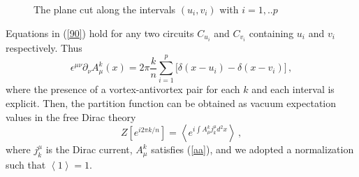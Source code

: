\documentclass[11pt]{article}
\begin{document}
\begin{figure} [tbp]
\centering
\leavevmode
\epsfxsize=10cm
\bigskip
{}
\caption{The plane cut along the intervals $(u_i,v_i)$ with $i=1,..p$}
\label{fihi}
\end{figure}



Equations in (\ref{90}) hold for any two circuits
$C_{u_{i}}$ and $C_{v_{i}}$  containing $u_{i}$ and $v_{i}$
respectively. Thus
\begin{equation}
\epsilon ^{\mu \nu }\partial _{\nu}A_{\mu }^{k}(x)=2\pi \frac{k}{n}
\sum_{i=1}^{p}\big[ \delta (x-u_{i})-\delta (x-v_{i})\big] \,,  \label{aa}
\end{equation}
where the presence of a vortex-antivortex pair for each $k$ and each interval is
explicit.  
Then, the partition function  can be obtained as vacuum expectation values in the free Dirac
theory 
\begin{equation}
Z[e^{i 2 \pi k/n}]=\left\langle e^{i\int A_{\mu }^{k}j_{k}^{\mu }d^{2}x}\right\rangle \,,
\label{fj}
\end{equation}
where $j_{k}^{\mu }$ is the Dirac current, $A_{\mu }^{k}$ satisfies
(\ref {aa}), and we adopted a normalization such that $\left\langle 1
\right\rangle = 1$.
\end{document}
